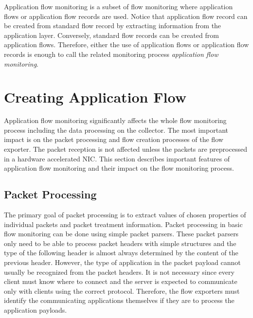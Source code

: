 Application flow monitoring is a subset of flow monitoring where application flows or application flow records are used. Notice that application flow record can be created from standard flow record by extracting information from the application layer. Conversely, standard flow records can be created from application flows. Therefore, either the use of application flows or application flow records is enough to call the related monitoring process \emph{application flow monitoring}.

\section{Creating Application Flow}\label{sec:creating-application-flow}

Application flow monitoring significantly affects the whole flow monitoring process including the data processing on the collector. The most important impact is on the packet processing and flow creation processes of the flow exporter. The packet reception is not affected unless the packets are preprocessed in a hardware accelerated NIC. This section describes important features of application flow monitoring and their impact on the flow monitoring process.

\subsection{Packet Processing}

The primary goal of packet processing is to extract values of chosen properties of individual packets and packet treatment information. Packet processing in basic flow monitoring can be done using simple packet parsers. These packet parsers only need to be able to process packet headers with simple structures and the type of the following header is almost always determined by the content of the previous header. However, the type of application in the packet payload cannot usually be recognized from the packet headers. It is not necessary since every client must know where to connect and the server is expected to communicate only with clients using the correct protocol. Therefore, the flow exporters must identify the communicating applications themselves if they are to process the application payloads.

